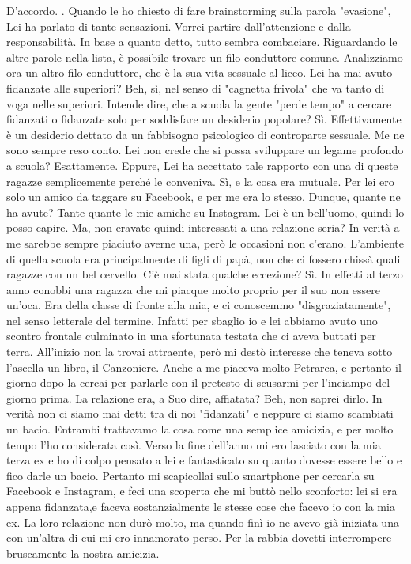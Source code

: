 \documentclass[a4paper,12pt]{article}
\newcommand{\Walter}{\speak{W}}
\newcommand{\Pollazzi}{\speak{P}}
\begin{document}
\begin{dialogue}
\Pollazzi D'accordo. . Quando le ho chiesto di fare brainstorming sulla parola "evasione", Lei ha parlato di tante sensazioni. Vorrei partire dall'attenzione e dalla responsabilità. In base a quanto detto, tutto sembra combaciare. Riguardando le altre parole nella lista, è possibile trovare un filo conduttore comune. Analizziamo ora un altro filo conduttore, che è la sua vita sessuale al liceo. Lei ha mai avuto fidanzate alle superiori?
\Walter Beh, sì, nel senso di "cagnetta frivola" che va tanto di voga nelle superiori.
\Pollazzi Intende dire, che a scuola la gente "perde tempo" a cercare fidanzati o fidanzate solo per soddisfare un desiderio popolare?
\Walter Sì. Effettivamente è un desiderio dettato da un fabbisogno psicologico di controparte sessuale. Me ne sono sempre reso conto.
\Pollazzi Lei non crede che si possa sviluppare un legame profondo a scuola?
\Walter Esattamente.
\Pollazzi Eppure, Lei ha accettato tale rapporto con una di queste ragazze semplicemente perché le conveniva.
\Walter Sì, e la cosa era mutuale. Per lei ero solo un amico da taggare su Facebook, e per me era lo stesso.
\Pollazzi Dunque, quante ne ha avute?
\Walter Tante quante le mie amiche su Instagram.
\Pollazzi Lei è un bell'uomo, quindi lo posso capire. Ma, non eravate quindi interessati a una relazione seria?
\Walter In verità a me sarebbe sempre piaciuto averne una, però le occasioni non c'erano. L'ambiente di quella scuola era principalmente di figli di papà, non che ci fossero chissà quali ragazze con un bel cervello.
\Pollazzi C'è mai stata qualche eccezione?
\Walter Sì. In effetti al terzo anno conobbi una ragazza che mi piacque molto proprio per il suo non essere un'oca. Era della classe di fronte alla mia, e ci conoscemmo "disgraziatamente", nel senso letterale del termine. Infatti per sbaglio io e lei abbiamo avuto uno scontro frontale culminato in una sfortunata testata che ci aveva buttati per terra. All'inizio non la trovai attraente, però mi destò interesse che teneva sotto l'ascella un libro, il Canzoniere. Anche a me piaceva molto Petrarca, e pertanto il giorno dopo la cercai per parlarle con il pretesto di scusarmi per l'inciampo del giorno prima.
\Pollazzi La relazione era, a Suo dire, affiatata?
\Walter Beh, non saprei dirlo. In verità non ci siamo mai detti tra di noi "fidanzati" e neppure ci siamo scambiati un bacio. Entrambi trattavamo la cosa come una semplice amicizia, e per molto tempo l'ho considerata così. Verso la fine dell'anno mi ero lasciato con la mia terza ex e ho di colpo pensato a lei e fantasticato su quanto dovesse essere bello e fico darle un bacio. Pertanto mi scapicollai sullo smartphone per cercarla su Facebook e Instagram, e feci una scoperta che mi buttò nello sconforto: lei si era appena fidanzata,e faceva sostanzialmente le stesse cose che facevo io con la mia ex. La loro relazione non durò molto, ma quando finì io ne avevo già iniziata una con un'altra di cui mi ero innamorato perso. Per la rabbia dovetti interrompere bruscamente la nostra amicizia.

\end{dialogue}
\end{document}
